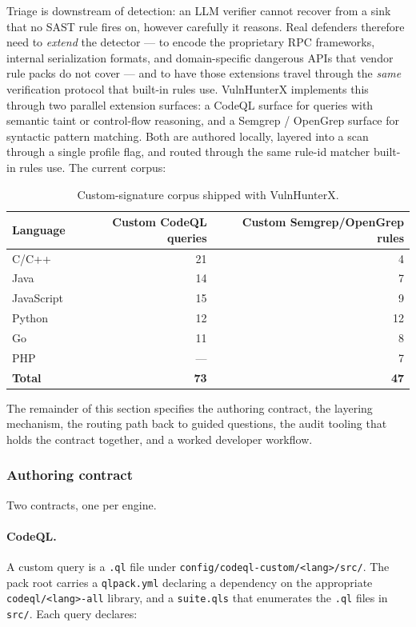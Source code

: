 \documentclass[11pt,a4paper]{article}
\begin{document}
Triage is downstream of detection: an LLM verifier cannot recover from
a sink that no SAST rule fires on, however carefully it reasons. Real
defenders therefore need to \emph{extend} the detector --- to encode
the proprietary RPC frameworks, internal serialization formats, and
domain-specific dangerous APIs that vendor rule packs do not cover ---
and to have those extensions travel through the \emph{same}
verification protocol that built-in rules use. VulnHunterX implements
this through two parallel extension surfaces: a CodeQL surface for
queries with semantic taint or control-flow reasoning, and a
Semgrep / OpenGrep surface for syntactic pattern matching. Both are
authored locally, layered into a scan through a single profile flag,
and routed through the same rule-id matcher built-in rules use. The
current corpus:

\begin{table}[h]
\centering
\caption{Custom-signature corpus shipped with VulnHunterX.}
\label{tab:custom-corpus}
\small
\begin{tabular}{lrr}
\toprule
\textbf{Language} & \textbf{Custom CodeQL queries} & \textbf{Custom Semgrep/OpenGrep rules} \\
\midrule
C/C++       & 21 & 4  \\
Java        & 14 & 7  \\
JavaScript  & 15 & 9  \\
Python      & 12 & 12 \\
Go          & 11 & 8  \\
PHP         & ---  & 7  \\
\midrule
\textbf{Total} & \textbf{73} & \textbf{47} \\
\bottomrule
\end{tabular}
\end{table}

The remainder of this section specifies the authoring contract, the
layering mechanism, the routing path back to guided questions, the
audit tooling that holds the contract together, and a worked developer
workflow.

\subsubsection{Authoring contract}

Two contracts, one per engine.

\paragraph{CodeQL.} A custom query is a \texttt{.ql} file under
\texttt{config/codeql-custom/<lang>/src/}. The pack root carries a
\texttt{qlpack.yml} declaring a dependency on the appropriate
\texttt{codeql/<lang>-all} library, and a \texttt{suite.qls} that
enumerates the \texttt{.ql} files in \texttt{src/}. Each query declares:
\end{document}
